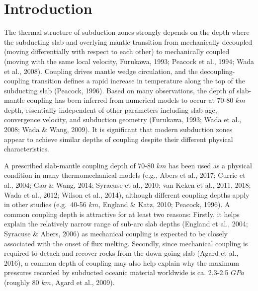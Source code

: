 \documentclass[draft,linenumbers]{agujournal2018}
\begin{document}
\section{Introduction}

The thermal structure of subduction zones strongly depends on the depth
where the subducting slab and overlying mantle transition from
mechanically decoupled (moving differentially with respect to each
other) to mechanically coupled (moving with the same local velocity,
Furukawa, 1993; Peacock et al., 1994; Wada et al., 2008). Coupling
drives mantle wedge circulation, and the decoupling-coupling transition
defines a rapid increase in temperature along the top of the subducting
slab (Peacock, 1996). Based on many observations, the depth of
slab-mantle coupling has been inferred from numerical models to occur at
70-80 \(km\) depth, essentially independent of other parameters
including slab age, convergence velocity, and subduction geometry
(Furukawa, 1993; Wada et al., 2008; Wada \& Wang, 2009). It is
significant that modern subduction zones appear to achieve similar
depths of coupling despite their different physical characteristics.

A prescribed slab-mantle coupling depth of 70-80 \(km\) has been used as
a physical condition in many thermomechanical models (e.g., Abers et
al., 2017; Currie et al., 2004; Gao \& Wang, 2014; Syracuse et al.,
2010; van Keken et al., 2011, 2018; Wada et al., 2012; Wilson et al.,
2014), although different coupling depths apply in other studies
(e.g.~40-56 \(km\), England \& Katz, 2010; Peacock, 1996). A common
coupling depth is attractive for at least two reasons: Firstly, it helps
explain the relatively narrow range of sub-arc slab depths (England et
al., 2004; Syracuse \& Abers, 2006) as mechanical coupling is expected
to be closely associated with the onset of flux melting. Secondly, since
mechanical coupling is required to detach and recover rocks from the
down-going slab (Agard et al., 2016), a common depth of coupling may
also help explain why the maximum pressures recorded by subducted
oceanic material worldwide is ca. 2.3-2.5 \(GPa\) (roughly 80 \(km\),
Agard et al., 2009).
\end{document}
